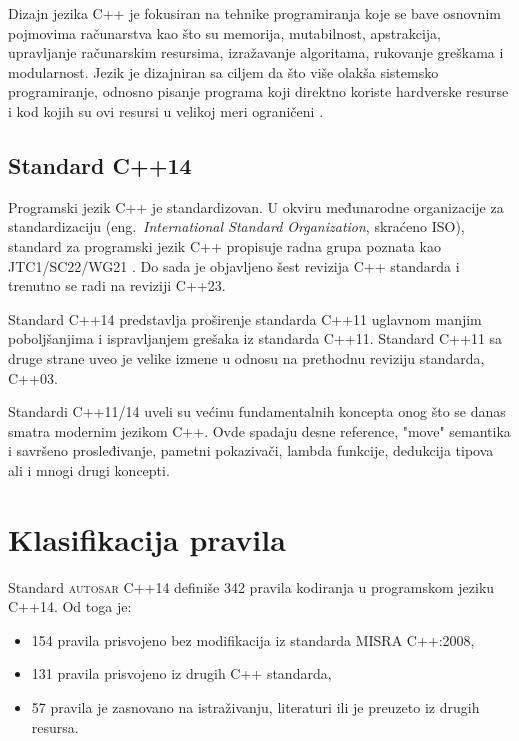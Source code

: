 \documentclass[12pt,oneside]{memoir}
\begin{document}
Dizajn jezika C++ je fokusiran na tehnike programiranja koje se bave osnovnim pojmovima ra\v{c}unarstva kao \v{s}to su memorija, mutabilnost, apstrakcija, upravljanje ra\v{c}unarskim resursima, izra\v{z}avanje algoritama, rukovanje gre\v{s}kama i modularnost. Jezik je dizajniran sa ciljem da \v{s}to vi\v{s}e olak\v{s}a sistemsko programiranje, odnosno pisanje programa koji direktno koriste hardverske resurse i kod kojih su ovi resursi u velikoj meri ograni\v{c}eni \cite{TheC++ProgrammingLanguage}.


\subsection{Standard C++14}

Programski jezik C++ je standardizovan. U okviru međunarodne organizacije za standardizaciju (eng.~\textit{International Standard Organization}, skra\'{c}eno ISO), standard za programski jezik C++ propisuje radna grupa poznata kao JTC1/SC22/W\-G21 \cite{ISOWebsite}. Do sada je objavljeno \v{s}est revizija C++ standarda i trenutno se radi na reviziji C++23. 
\indent

Standard C++14 predstavlja pro\v{s}irenje standarda C++11 uglavnom manjim pobolj\v{s}anjima i ispravljanjem gre\v{s}aka iz standarda C++11. Standard C++11 sa druge strane uveo je velike izmene u odnosu na prethodnu reviziju standarda, C++03. \par
Standardi C++11/14 uveli su ve\'{c}inu fundamentalnih koncepta onog \v{s}to se danas smatra modernim jezikom C++. Ovde spadaju desne reference, "move" semantika i savr\v{s}eno prosleđivanje, pametni pokaziva\v{c}i, lambda funkcije, dedukcija tipova ali i mnogi drugi koncepti.

\section{Klasifikacija pravila}
\label{sec:klasifikacija}

Standard \textsc{autosar} C++14 definiše 342 pravila kodiranja u programskom jeziku C++14. Od toga je:
\begin{itemize}
  \item {154 pravila prisvojeno bez modifikacija iz standarda MISRA C++:2008,}
  \item {131 pravila prisvojeno iz drugih C++ standarda,}
  \item {57 pravila je zasnovano na istraživanju, literaturi ili je preuzeto iz drugih resursa.}
\end{itemize}
\end{document}

